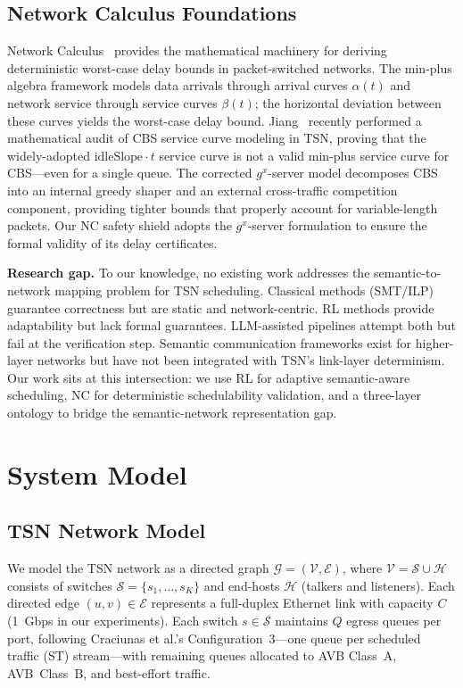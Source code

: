 \documentclass[conference]{IEEEtran}
\begin{document}
\subsection{Network Calculus Foundations}

Network Calculus~\cite{jiang2024ncrevisit} provides the mathematical machinery for deriving deterministic worst-case delay bounds in packet-switched networks. The min-plus algebra framework models data arrivals through arrival curves $\alpha(t)$ and network service through service curves $\beta(t)$; the horizontal deviation between these curves yields the worst-case delay bound. Jiang~\cite{jiang2024ncrevisit} recently performed a mathematical audit of CBS service curve modeling in TSN, proving that the widely-adopted $\text{idleSlope}\cdot t$ service curve is not a valid min-plus service curve for CBS---even for a single queue. The corrected $g^x$-server model decomposes CBS into an internal greedy shaper and an external cross-traffic competition component, providing tighter bounds that properly account for variable-length packets. Our NC safety shield adopts the $g^x$-server formulation to ensure the formal validity of its delay certificates.

\textbf{Research gap.} To our knowledge, no existing work addresses the semantic-to-network mapping problem for TSN scheduling. Classical methods (SMT/ILP) guarantee correctness but are static and network-centric. RL methods provide adaptability but lack formal guarantees. LLM-assisted pipelines attempt both but fail at the verification step. Semantic communication frameworks exist for higher-layer networks but have not been integrated with TSN's link-layer determinism. Our work sits at this intersection: we use RL for adaptive semantic-aware scheduling, NC for deterministic schedulability validation, and a three-layer ontology to bridge the semantic-network representation gap.

\section{System Model}

\subsection{TSN Network Model}

We model the TSN network as a directed graph $\mathcal{G} = (\mathcal{V}, \mathcal{E})$, where $\mathcal{V} = \mathcal{S} \cup \mathcal{H}$ consists of switches $\mathcal{S} = \{s_1, \ldots, s_K\}$ and end-hosts $\mathcal{H}$ (talkers and listeners). Each directed edge $(u,v) \in \mathcal{E}$ represents a full-duplex Ethernet link with capacity $C$ (1~Gbps in our experiments). Each switch $s \in \mathcal{S}$ maintains $Q$ egress queues per port, following Craciunas et al.'s Configuration~3---one queue per scheduled traffic (ST) stream---with remaining queues allocated to AVB Class~A, AVB~Class~B, and best-effort traffic.
\end{document}
